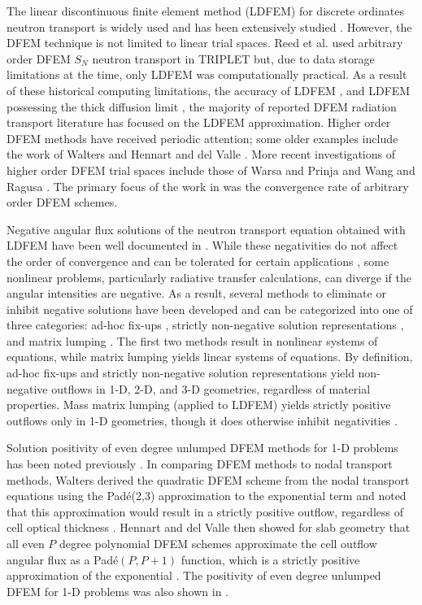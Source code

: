 The linear discontinuous finite element method (LDFEM) for discrete ordinates neutron transport is widely used and has been extensively studied \cite{ld_fine_mesh,hamilton,csz,adams}.  
However, the DFEM technique is not limited to linear trial spaces.
Reed et al. \cite{reed} used arbitrary order DFEM $S_N$ neutron transport in TRIPLET but, due to data storage limitations at the time, only LDFEM was computationally practical.
As a result of these historical computing limitations,  the accuracy of LDFEM \cite{larsen_nelson}, and LDFEM possessing the thick diffusion limit \cite{larsen_morel_asymptotics},
the majority of reported DFEM radiation transport literature has focused on the LDFEM approximation.
Higher order DFEM methods have received periodic attention; some older examples include the work of Walters \cite{walters} and Hennart and del Valle \cite{hennart_delvalle_2,hennart_delvalle_3}.
More recent investigations of higher order DFEM trial spaces include those of  Warsa and Prinja \cite{warsa_prinja} and Wang and Ragusa \cite{yaqi_ragusa,yaqi_ragusa2}.  
The primary focus of the work in \cite{hennart_delvalle_2,hennart_delvalle_3, warsa_prinja, yaqi_ragusa, yaqi_ragusa2} was the convergence rate of arbitrary order DFEM schemes. 

Negative angular flux solutions of the neutron transport equation obtained with LDFEM have been well documented in \cite{hamilton,csz,adams}.  
While these negativities do not affect the order of convergence and can be tolerated for certain applications \cite{lathrop}, some nonlinear problems, particularly radiative transfer calculations, can diverge if the angular intensities are negative.  
As a result, several methods to eliminate or inhibit negative solutions have been developed and can be categorized into one of three categories: ad-hoc fix-ups  \cite{hamilton}, strictly non-negative solution representations \cite{csz}, and matrix lumping \cite{adams}.  
The first two methods result in nonlinear systems of equations, while matrix lumping yields linear systems of equations.  
By definition, ad-hoc fix-ups and strictly non-negative solution representations yield non-negative outflows in 1-D, 2-D, and 3-D geometries, regardless of material properties.  
Mass matrix lumping (applied to LDFEM) yields strictly positive outflows only in 1-D geometries, though it does otherwise inhibit negativities \cite{adams}.   

Solution positivity of even degree unlumped DFEM methods for 1-D problems has been noted previously \cite{walters,hennart_delvalle_2,hennart_delvalle_3}.
In comparing DFEM methods to nodal transport methods, Walters derived the quadratic DFEM scheme from the nodal transport equations using the Pad\'{e}(2,3) approximation to the exponential term and noted that this approximation would result in a strictly positive outflow, regardless of cell optical thickness \cite{walters}.
Hennart and del Valle then showed for slab geometry that all even $P$ degree polynomial DFEM schemes approximate the cell outflow angular flux as a Pad\'{e}$(P,P+1)$ function, which is a strictly positive approximation of the exponential \cite{hennart_delvalle_2,hennart_delvalle_3}.
The positivity of even degree unlumped DFEM for 1-D problems was also shown in \cite{warsa_prinja}.

